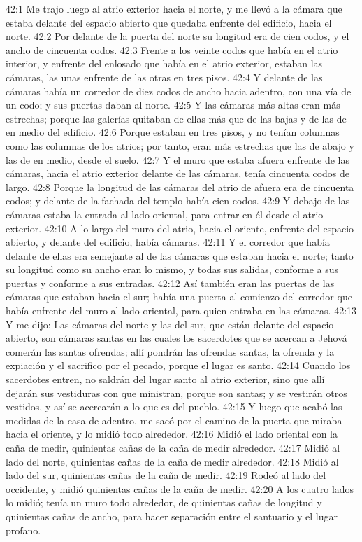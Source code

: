 42:1 Me trajo luego al atrio exterior hacia el norte, y me llevó a la cámara que estaba delante del espacio abierto que quedaba enfrente del edificio, hacia el norte.   
42:2 Por delante de la puerta del norte su longitud era de cien codos, y el ancho de cincuenta codos.   
42:3 Frente a los veinte codos   que había en el atrio interior, y enfrente del enlosado que había en el atrio exterior, estaban las cámaras, las unas enfrente de las otras en tres pisos.   
42:4 Y delante de las cámaras había un corredor de diez codos de ancho hacia adentro, con una vía de un codo; y sus puertas daban al norte.   
42:5 Y las cámaras más altas eran más estrechas; porque las galerías quitaban de ellas más que de las bajas y de las de en medio del edificio.   
42:6 Porque estaban en tres pisos, y no tenían columnas como las columnas de los atrios; por tanto, eran más estrechas que las de abajo y las de en medio, desde el suelo.   
42:7 Y el muro que estaba afuera enfrente de las cámaras, hacia el atrio exterior delante de las cámaras, tenía cincuenta codos   de largo.   
42:8 Porque la longitud de las cámaras del atrio de afuera era de cincuenta codos; y delante de la fachada del templo había cien codos.   
42:9 Y debajo de las cámaras estaba la entrada al lado oriental, para entrar en él desde el atrio exterior.   
42:10 A lo largo del muro del atrio, hacia el oriente, enfrente del espacio abierto, y delante del edificio, había cámaras.   
42:11 Y el corredor que había delante de ellas era semejante al de las cámaras que estaban hacia el norte; tanto su longitud como su ancho eran lo mismo, y todas sus salidas, conforme a sus puertas y conforme a sus entradas.   
42:12 Así también eran las puertas de las cámaras que estaban hacia el sur; había una puerta al comienzo del corredor que había enfrente del muro al lado oriental, para quien entraba en las cámaras.   
42:13 Y me dijo: Las cámaras del norte y las del sur, que están delante del espacio abierto, son cámaras santas en las cuales los sacerdotes que se acercan a Jehová comerán las santas ofrendas; allí pondrán las ofrendas santas, la ofrenda y la expiación y el sacrifico por el pecado, porque el lugar es santo.   
42:14 Cuando los sacerdotes entren, no saldrán del lugar santo al atrio exterior, sino que allí dejarán sus vestiduras con que ministran, porque son santas; y se vestirán otros vestidos, y así se acercarán a lo que es del pueblo.   
42:15 Y luego que acabó las medidas de la casa de adentro, me sacó por el camino de la puerta que miraba hacia el oriente, y lo midió todo alrededor.   
42:16 Midió el lado oriental con la caña de medir, quinientas cañas   de la caña de medir alrededor.   
42:17 Midió al lado del norte, quinientas cañas   de la caña de medir alrededor.   
42:18 Midió al lado del sur, quinientas cañas   de la caña de medir.   
42:19 Rodeó al lado del occidente, y midió quinientas cañas   de la caña de medir.   
42:20 A los cuatro lados lo midió; tenía un muro todo alrededor, de quinientas cañas   de longitud y quinientas cañas de ancho, para hacer separación entre el santuario y el lugar profano. 
